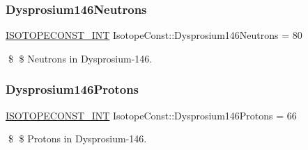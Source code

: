 \subsubsection{\texorpdfstring{Dysprosium146\+Neutrons}{Dysprosium146Neutrons}}
{\footnotesize\ttfamily \mbox{\hyperlink{group___isotope_const-_macros_ga5f18360b3e99483a35c32d789e62621c}{I\+S\+O\+T\+O\+P\+E\+C\+O\+N\+S\+T\+\_\+\+I\+NT}} Isotope\+Const\+::\+Dysprosium146\+Neutrons = 80}

\$ \$ Neutrons in Dysprosium-\/146. \mbox{\label{group___isotope_const-_dysprosium-_dy146_ga18b5471946d9e60d741de877513e633d}} 
\subsubsection{\texorpdfstring{Dysprosium146\+Protons}{Dysprosium146Protons}}
{\footnotesize\ttfamily \mbox{\hyperlink{group___isotope_const-_macros_ga5f18360b3e99483a35c32d789e62621c}{I\+S\+O\+T\+O\+P\+E\+C\+O\+N\+S\+T\+\_\+\+I\+NT}} Isotope\+Const\+::\+Dysprosium146\+Protons = 66}

\$ \$ Protons in Dysprosium-\/146. 